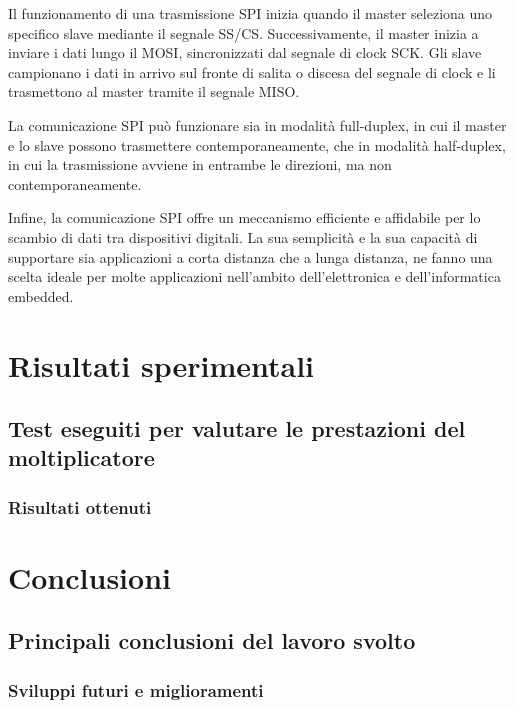 \documentclass[titlepage]{report}
\begin{document}
			Il funzionamento di una trasmissione SPI inizia quando il master seleziona uno specifico slave mediante il segnale SS/CS. Successivamente, il master inizia a inviare i dati lungo il MOSI, sincronizzati dal segnale di clock SCK. Gli slave campionano i dati in arrivo sul fronte di salita o discesa del segnale di clock e li trasmettono al master tramite il segnale MISO.

			La comunicazione SPI può funzionare sia in modalità full-duplex, in cui il master e lo slave possono trasmettere contemporaneamente, che in modalità half-duplex, in cui la trasmissione avviene in entrambe le direzioni, ma non contemporaneamente.

			Infine, la comunicazione SPI offre un meccanismo efficiente e affidabile per lo scambio di dati tra dispositivi digitali. La sua semplicità e la sua capacità di supportare sia applicazioni a corta distanza che a lunga distanza, ne fanno una scelta ideale per molte applicazioni nell'ambito dell'elettronica e dell'informatica embedded.

\chapter{Risultati sperimentali}
\label{ch:risultati_sperimentali}

	\section{Test eseguiti per valutare le prestazioni del moltiplicatore}
	\label{sec:test_prestazioni}
		\subsection{Risultati ottenuti}
		\label{subsec:risultati}

\chapter{Conclusioni}
\label{ch:conclusioni}

	\section{Principali conclusioni del lavoro svolto}
	\label{sec:conclusioni}
		\subsection{Sviluppi futuri e miglioramenti}
		\label{subsec:sviluppi_futuri}
\end{document}
